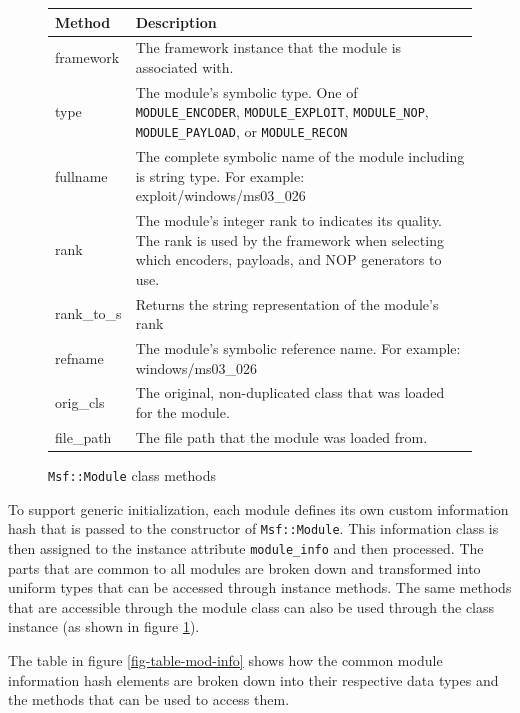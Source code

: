 \documentclass{report}
\begin{document}
\begin{figure}[h]
\begin{center}
\begin{tabular}{|l|p{3.5in}|}
\hline
\textbf{Method} & \textbf{Description} \\
\hline
framework & The framework instance that the module is associated with. \\
\hline
type & The module's symbolic type.  One of \texttt{MODULE\_ENCODER}, \texttt{MODULE\_EXPLOIT}, \texttt{MODULE\_NOP}, \texttt{MODULE\_PAYLOAD}, or \texttt{MODULE\_RECON} \\
\hline
fullname & The complete symbolic name of the module including is string type.  For example: exploit/windows/ms03\_026 \\
\hline
rank & The module's integer rank to indicates its quality.  The rank is used by the framework when selecting which encoders, payloads, and NOP generators to use. \\
\hline
rank\_to\_s & Returns the string representation of the module's rank \\
\hline
refname & The module's symbolic reference name.  For example: windows/ms03\_026 \\
\hline
orig\_cls & The original, non-duplicated class that was loaded for the module. \\
\hline
file\_path & The file path that the module was loaded from. \\
\hline
\end{tabular}
\caption{\texttt{Msf::Module} class methods}
\label{fig-table-mod-class-methods}
\end{center}
\end{figure}

\par
To support generic initialization, each module defines its own
custom information hash that is passed to the constructor of
\texttt{Msf::Module}.  This information class is then assigned to
the instance attribute \texttt{module\_info} and then processed. The
parts that are common to all modules are broken down and transformed
into uniform types that can be accessed through instance methods.
The same methods that are accessible through the module class can
also be used through the class instance (as shown in figure
\ref{fig-table-mod-class-methods}).

\par
The table in figure \ref{fig-table-mod-info} shows how the common
module information hash elements are broken down into their
respective data types and the methods that can be used to access
them.
\end{document}
